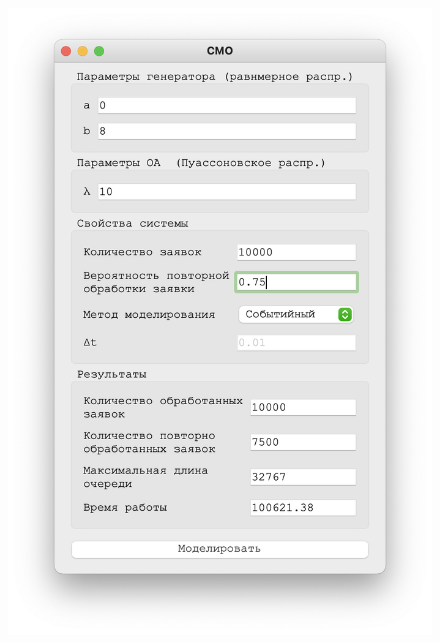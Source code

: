  
 \begin{figure}[!htb]
    \begin{minipage}{0.55\textwidth}
      \centering
      \includegraphics[width=1\linewidth]{10-75-s}
    \end{minipage}\hfill
    \begin{minipage}{0.55\textwidth}
      \centering

\end{minipage}
\end{figure}
